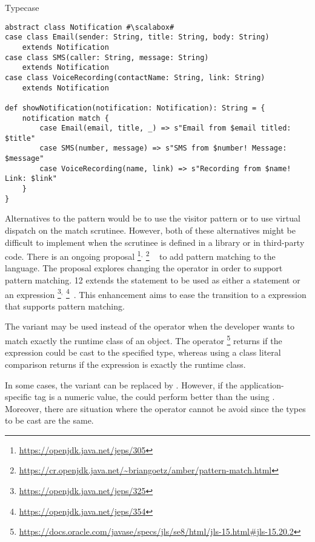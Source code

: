\begin{pattern}{Typecase}
\begin{verbatim}
abstract class Notification #\scalabox#
case class Email(sender: String, title: String, body: String)
	extends Notification
case class SMS(caller: String, message: String)
	extends Notification
case class VoiceRecording(contactName: String, link: String)
	extends Notification

def showNotification(notification: Notification): String = {
	notification match {
		case Email(email, title, _) => s"Email from $email titled: $title"
		case SMS(number, message) => s"SMS from $number! Message: $message"
		case VoiceRecording(name, link) => s"Recording from $name! Link: $link"
	}
}
\end{verbatim}

Alternatives to the \thisp{} pattern would be to use the visitor pattern or to use virtual dispatch on the match scrutinee.
However, both of these alternatives might be difficult to implement when the scrutinee is defined in a library or in third-party code.
There is an ongoing proposal%
\footnote{\url{https://openjdk.java.net/jeps/305}}$^{,}$%
\footnote{\url{https://cr.openjdk.java.net/~briangoetz/amber/pattern-match.html}}%
~\citep{jep305} to add pattern matching to the \java{} language.
The proposal explores changing the  operator in order to support pattern matching.
\java{} 12 extends the  statement to be used as either a statement or an expression%
\footnote{\url{https://openjdk.java.net/jeps/325}}$^{,}$%
\footnote{\url{https://openjdk.java.net/jeps/354}}~\citep{jep325,jep354}.
This enhancement aims to ease the transition to a  expression that supports pattern matching.

The  variant may be used instead of the  operator when the developer wants to match exactly the runtime class of an object.
The  operator%
\footnote{\url{https://docs.oracle.com/javase/specs/jls/se8/html/jls-15.html\#jls-15.20.2}}
returns  if the expression could be cast to the specified type,
whereas using a class literal comparison returns  if the expression is exactly the runtime class.

In some cases, the  variant can be replaced by .
However, if the application-specific tag is a numeric value,
the  could perform better than the  using .
Moreover, there are situation where the  operator cannot be avoid since the types to be cast are the same.

\end{pattern}
